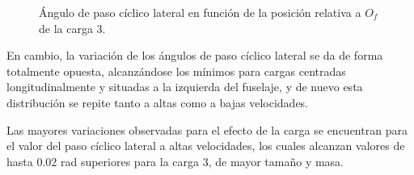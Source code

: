 \begin{figure}
	\centering
	\caption{Ángulo de paso cíclico lateral en función de la posición relativa a $O_f$ de la carga 3.}
	\label{theta1SVH3lxy}
\end{figure}

En cambio, la variación de los ángulos de paso cíclico lateral se da de forma totalmente opuesta, alcanzándose los mínimos para cargas centradas longitudinalmente y situadas a la izquierda del fuselaje, y de nuevo esta distribución se repite tanto a altas como a bajas velocidades.

Las mayores variaciones observadas para el efecto de la carga se encuentran para el valor del paso cíclico lateral a altas velocidades, los cuales alcanzan valores de hasta 0.02 rad superiores para la carga 3, de mayor tamaño y masa.

